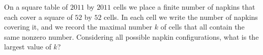 On a square table of $2011$ by $2011$ cells we place a finite number of napkins that each cover a square of $52$ by $52$ cells. In each cell we write the number of napkins covering it, and we record the maximal number $k$ of cells that all contain the same nonzero number. Considering all possible napkin configurations, what is the largest value of $k$?

